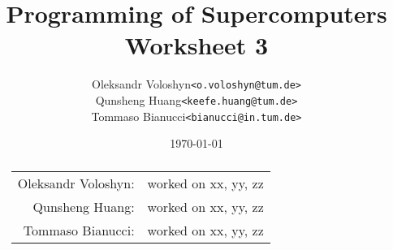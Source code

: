 \documentclass{article}
\title{Programming of Supercomputers\\Worksheet 3}
\author{
	\begin{tabular}{rl}
		Oleksandr Voloshyn& \texttt{<o.voloshyn@tum.de>}\\ 
		Qunsheng Huang& \texttt{<keefe.huang@tum.de>}\\ 
		Tommaso Bianucci& \texttt{<bianucci@in.tum.de>}
	\end{tabular}
}
\date{\today}
\begin{document}
\maketitle
\renewcommand{\abstractname}{Group members's contributions}
\begin{abstract}
	\begin{center}
		\begin{tabular}{rl}
		Oleksandr Voloshyn:& worked on xx, yy, zz\\
		Qunsheng Huang:& worked on xx, yy, zz\\
		Tommaso Bianucci:& worked on xx, yy, zz
		\end{tabular}
	\end{center}
\end{abstract}




\end{document}
